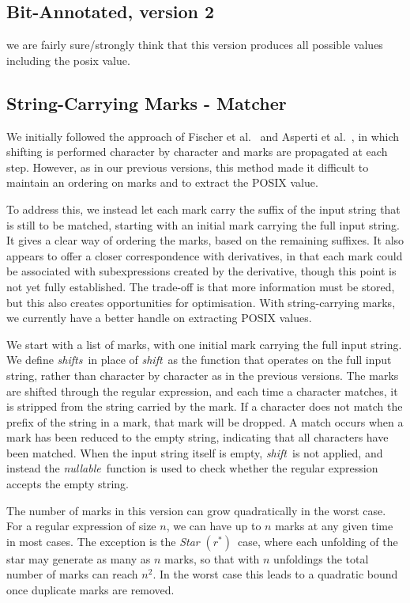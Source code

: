 \documentclass[12pt]{article}
\newcommand{\shift}{\textit{shift}}
\newcommand{\shifts}{\textit{shifts}}
\newcommand{\nullable}{\textit{nullable}}
\newcommand{\STARText}{\textit{Star} $(r^*)$}
\begin{document}
  
\FloatBarrier
\subsection{Bit-Annotated, version 2}
we are fairly sure/strongly think that this version produces all possible values including the posix value.

\FloatBarrier
\subsection{String-Carrying Marks - Matcher}
We initially followed the approach of Fischer et al.~\cite{Fischer2010} and Asperti et al.~\cite{Asperti2010}, in which shifting is performed character by 
character and marks are propagated at each step. However, as in our previous versions, this method made it difficult to maintain an ordering on marks and to 
extract the POSIX value.  

To address this, we instead let each mark carry the suffix of the input string that is still to be matched, starting with an initial mark carrying the full 
input string. It gives a clear way of ordering the marks,  
based on the remaining suffixes.  
It also appears to offer a closer correspondence with derivatives,  
in that each mark could be associated with subexpressions created by the derivative,  
though this point is not yet fully established. 
The trade-off is that more information must be 
stored, but this also creates opportunities for optimisation. With string-carrying marks, we currently have a better handle on extracting POSIX values.


We start with a list of marks, with one initial mark carrying the full input string.
We define \shifts\ in place of \shift\ as the function that operates on the full input 
string, rather than character by character as in the previous versions.
The marks are shifted through the regular expression, and each time a character matches, 
it is stripped from the string carried by the mark.
If a character does not match the prefix of the string in a mark, that mark will be dropped.
A match occurs when a mark has been reduced to the empty string,
indicating that all characters have been matched.
When the input string itself is empty, \shift\ is not applied,
and instead the \nullable\ function is used to check whether the 
regular expression accepts the empty string.

The number of marks in this version can grow quadratically in the worst case. 
For a regular expression of size $n$, we can have up to $n$ marks at any given time in most cases. 
The exception is the \STARText\ case, where each unfolding of the star may generate as many as $n$ marks, 
so that with $n$ unfoldings the total number of marks can reach $n^2$. 
In the worst case this leads to a quadratic bound once duplicate marks are removed.
\end{document}
